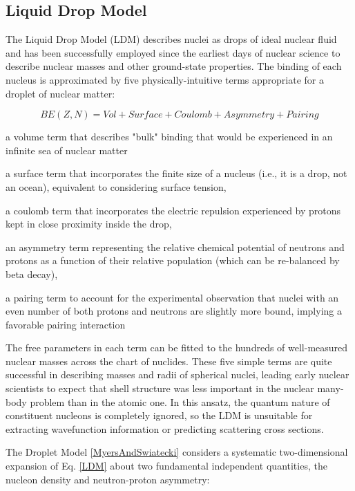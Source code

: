 \subsection{Liquid Drop Model}

The Liquid Drop Model (LDM) describes nuclei as drops of ideal nuclear fluid and
has been successfully employed since the earliest days of nuclear science to
describe nuclear masses and other ground-state properties. The binding of each
nucleus is approximated by five physically-intuitive terms appropriate for
a droplet of nuclear matter:

\begin{equation} \label{LDM}
    BE(Z, N) = Vol + Surface + Coulomb + Asymmetry + Pairing
\end{equation}

a volume term that describes "bulk" binding that would be experienced in an
infinite sea of nuclear matter

a surface term that incorporates the finite size of a nucleus (i.e., it is a
drop, not an ocean), equivalent to considering surface tension,

a coulomb term that incorporates the electric repulsion experienced by protons
kept in close proximity inside the drop,

an asymmetry term representing the relative chemical potential of neutrons and
protons as a function of their relative population (which can be re-balanced by
beta decay),

a pairing term to account for the experimental observation that nuclei with an
even number of both protons and neutrons are slightly more bound, implying a
favorable pairing interaction

The free parameters in each term can be fitted to the hundreds of well-measured nuclear masses
across the chart of nuclides. These five simple terms are quite successful
in describing masses and radii of spherical nuclei, leading early nuclear
scientists to expect that shell structure was less important in the nuclear
many-body problem than in the atomic one. In this ansatz, the quantum
nature of constituent nucleons is completely ignored, so the LDM is  
unsuitable for extracting wavefunction information or predicting scattering
cross sections.

The Droplet Model \ref{MyersAndSwiatecki} considers a systematic two-dimensional expansion of
Eq. \ref{LDM} about two fundamental independent quantities, the nucleon density
and neutron-proton asymmetry:

